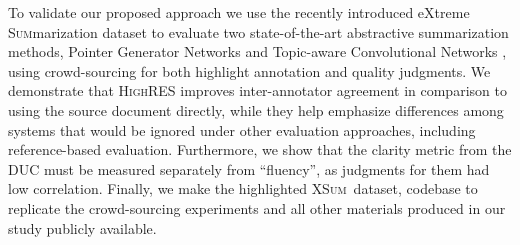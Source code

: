 \documentclass[11pt,a4paper]{article}
\newcommand\highres{\textsc{HighRES}}
\newcommand\ptgen{\textsc{PtGen}}
\newcommand\tconv{\textsc{TConvS2S}}
\newcommand\xsum{\textsc{XSum}}
\begin{document}

To validate our proposed approach we use the recently introduced e\textsc{X}treme \textsc{Sum}marization dataset \citep[\xsum,][]{narayan18xsum} to evaluate two state-of-the-art abstractive summarization methods, Pointer Generator Networks \citep{See2017} and Topic-aware Convolutional Networks \citep{narayan18xsum}, using crowd-sourcing for both highlight annotation and quality judgments.
We demonstrate that \highres{} improves inter-annotator agreement in comparison to using the source document directly, while they help emphasize differences among systems that would be ignored under other evaluation approaches, including reference-based evaluation. Furthermore, we show that the clarity metric from the DUC \citep{dang2005overview} must be measured separately from ``fluency'', as judgments for them had low correlation. %
Finally, we make the highlighted \xsum\ dataset, codebase to replicate the crowd-sourcing experiments and all other materials produced in our study publicly available.


\end{document}

